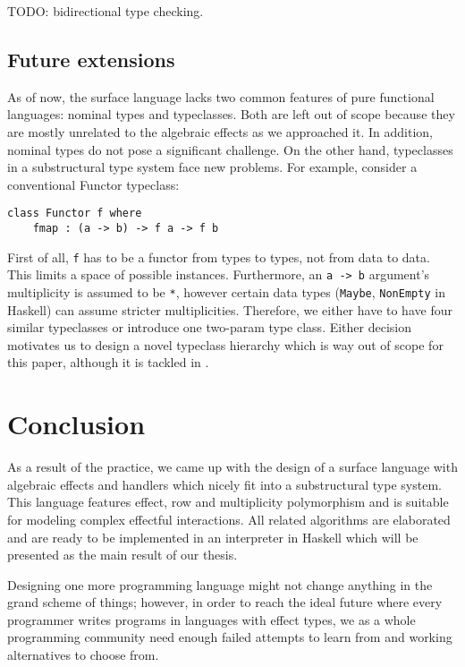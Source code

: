 \documentclass[a4paper,14pt]{extreport}
\begin{document}
TODO: bidirectional type checking.

\section{Future extensions}

As of now, the surface language lacks two common features of pure functional
languages: nominal types and typeclasses. Both are left out of scope because
they are mostly unrelated to the algebraic effects as we approached it. In
addition, nominal types do not pose a significant challenge. On the other hand,
typeclasses in a substructural type system face new problems. For example,
consider a conventional Functor typeclass:

\begin{verbatim}
class Functor f where
    fmap : (a -> b) -> f a -> f b
\end{verbatim}

First of all, \verb|f| has to be a functor from types to types, not from data to
data. This limits a space of possible instances. Furthermore, an \verb|a -> b|
argument's multiplicity is assumed to be \verb|*|, however certain data types
(\verb|Maybe|, \verb|NonEmpty| in Haskell) can assume stricter multiplicities.
Therefore, we either have to have four similar typeclasses or introduce one
two-param type class. Either decision motivates us to design a novel typeclass
hierarchy which is way out of scope for this paper, although it is tackled in
\cite{linear-base}.

\chapter{Conclusion}

As a result of the practice, we came up with the design of a surface language
with algebraic effects and handlers which nicely fit into a substructural type
system. This language features effect, row and multiplicity polymorphism and is
suitable for modeling complex effectful interactions. All related algorithms are
elaborated and are ready to be implemented in an interpreter in Haskell which
will be presented as the main result of our thesis.

Designing one more programming language might not change anything in the grand
scheme of things; however, in order to reach the ideal future where every
programmer writes programs in languages with effect types, we as a whole
programming community need enough failed attempts to learn from and working
alternatives to choose from.
\end{document}
